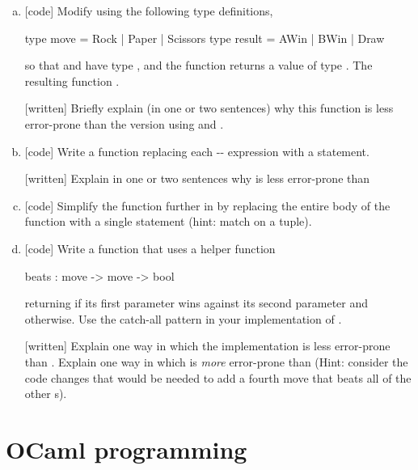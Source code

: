 \documentclass{pset}
\begin{document}
\newpage{}
\begin{enumerate}[(a)]
\item{} [code] Modify  using the following type definitions, 
      \begin{ocaml}
      type move   = Rock | Paper | Scissors
      type result = AWin | BWin  | Draw
      \end{ocaml}
      so that  and  have type , and the
      function returns a value of type .  The resulting
      function .

      [written] Briefly explain (in one or two sentences) why this
      function is less error-prone than the version using
       and .

\item{} [code] Write a function 
  replacing each -- expression with a
   statement.

  [written] Explain in one or two sentences why  is less error-prone than

\item{} [code] Simplify the function further in
   by replacing the entire body of the
  function with a single  statement (hint: match on a
  tuple).

\item{} [code] Write a function  that uses
  a helper function
    \begin{ocaml}
    beats : move -> move -> bool
    \end{ocaml}
  returning
   if its first parameter wins against its second parameter
  and  otherwise. Use the catch-all pattern \code{_} in
  your implementation of .

 [written] Explain one way in which the 
 implementation is less error-prone than
 .  Explain one way in which
  is \textit{more} error-prone than
  (Hint: consider the code changes that
 would be needed to add a fourth move  that beats all of
 the other s).
\end{enumerate}

\section*{OCaml programming}
\end{document}
